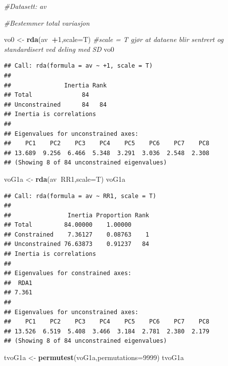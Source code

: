 \documentclass[]{article}
\newenvironment{Shaded}{\begin{snugshade}}{\end{snugshade}}
\newcommand{\CommentTok}[1]{\textcolor[rgb]{0.56,0.35,0.01}{\textit{#1}}}
\newcommand{\DataTypeTok}[1]{\textcolor[rgb]{0.13,0.29,0.53}{#1}}
\newcommand{\DecValTok}[1]{\textcolor[rgb]{0.00,0.00,0.81}{#1}}
\newcommand{\KeywordTok}[1]{\textcolor[rgb]{0.13,0.29,0.53}{\textbf{#1}}}
\newcommand{\NormalTok}[1]{#1}
\newcommand{\OperatorTok}[1]{\textcolor[rgb]{0.81,0.36,0.00}{\textbf{#1}}}
\newcommand{\StringTok}[1]{\textcolor[rgb]{0.31,0.60,0.02}{#1}}
\begin{document}
\begin{Shaded}
\begin{Highlighting}[]
\CommentTok{#Datasett: av}

\CommentTok{#Bestemmer total variasjon}

\NormalTok{vo0 <-}\StringTok{ }\KeywordTok{rda}\NormalTok{(av}\OperatorTok{~+}\DecValTok{1}\NormalTok{,}\DataTypeTok{scale=}\NormalTok{T)  }\CommentTok{#scale = T gjør at dataene blir sentrert og standardisert ved deling med SD}
\NormalTok{vo0}
\end{Highlighting}
\end{Shaded}

\begin{verbatim}
## Call: rda(formula = av ~ +1, scale = T)
## 
##               Inertia Rank
## Total              84     
## Unconstrained      84   84
## Inertia is correlations 
## 
## Eigenvalues for unconstrained axes:
##    PC1    PC2    PC3    PC4    PC5    PC6    PC7    PC8 
## 13.689  9.256  6.466  5.348  3.291  3.036  2.548  2.308 
## (Showing 8 of 84 unconstrained eigenvalues)
\end{verbatim}

\begin{Shaded}
\begin{Highlighting}[]
\NormalTok{voG1a <-}\StringTok{ }\KeywordTok{rda}\NormalTok{(av}\OperatorTok{~}\NormalTok{RR1,}\DataTypeTok{scale=}\NormalTok{T)}
\NormalTok{voG1a}
\end{Highlighting}
\end{Shaded}

\begin{verbatim}
## Call: rda(formula = av ~ RR1, scale = T)
## 
##                Inertia Proportion Rank
## Total         84.00000    1.00000     
## Constrained    7.36127    0.08763    1
## Unconstrained 76.63873    0.91237   84
## Inertia is correlations 
## 
## Eigenvalues for constrained axes:
##  RDA1 
## 7.361 
## 
## Eigenvalues for unconstrained axes:
##    PC1    PC2    PC3    PC4    PC5    PC6    PC7    PC8 
## 13.526  6.519  5.408  3.466  3.184  2.781  2.380  2.179 
## (Showing 8 of 84 unconstrained eigenvalues)
\end{verbatim}

\begin{Shaded}
\begin{Highlighting}[]
\NormalTok{tvoG1a <-}\StringTok{ }\KeywordTok{permutest}\NormalTok{(voG1a,}\DataTypeTok{permutations=}\DecValTok{9999}\NormalTok{)}
\NormalTok{tvoG1a}
\end{Highlighting}
\end{Shaded}
\end{document}
